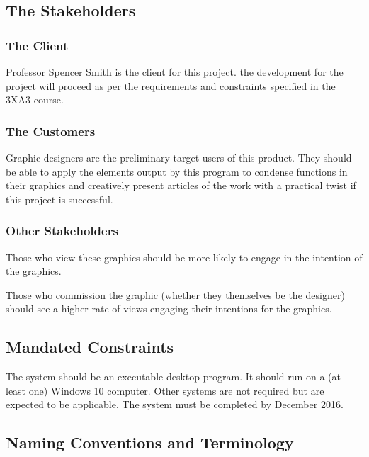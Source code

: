 \documentclass[12pt, titlepage]{article}
\begin{document}
\subsection{The Stakeholders}
	
\subsubsection{The Client}

	Professor Spencer Smith is the client for this project. the development for 
	the project will proceed as per the requirements and constraints specified 
	in the 3XA3 course.

\subsubsection{The Customers}

	Graphic designers are the preliminary target users of this product. 
	They should be able to apply the elements output by this program to 
	condense functions in their graphics and creatively present articles of 
	the work with a practical twist if this project is successful.

\subsubsection{Other Stakeholders}

	Those who view these graphics should be more likely to engage in the 
	intention of the graphics.
	
	Those who commission the graphic (whether they themselves be the 
	designer) should see a higher rate of views engaging their intentions 
	for the graphics.

\subsection{Mandated Constraints}

	The system should be an executable desktop program. It should run on a (at 
	least one) Windows 10 computer. Other systems are not required but are 
	expected to be applicable. The system must be completed by December 2016.

\subsection{Naming Conventions and Terminology}

		\paragraph{}
		
\end{document}
